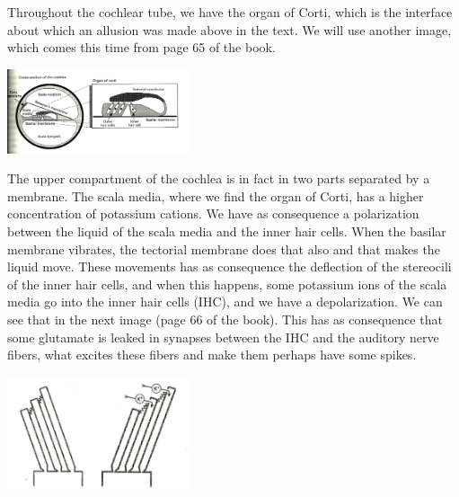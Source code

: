 Throughout the cochlear tube, we have the organ of Corti, which is the interface
about which an allusion was made above in the text. We will use another image, 
which comes this time from page 65 of the book.

\includegraphics[width=0.4\textwidth]{images/corti-aud65-level.jpg} %

The upper compartment of the cochlea is in fact in two parts separated by a membrane.
The scala media, where we find the organ of Corti, has a higher 
concentration of potassium cations. We have as consequence a polarization between
the liquid of the scala media and the inner hair cells. 
When the basilar membrane vibrates, the tectorial membrane does 
that also and that makes the liquid move. 
These movements has as consequence the deflection of the stereocili 
of the inner hair cells, and when this happens, some potassium ions of the 
scala media go into the inner hair cells (IHC), and we have a depolarization. 
We can see that in the next image (page 66 of the book).
This has as consequence that some glutamate is leaked in synapses 
between the IHC and the auditory nerve fibers, what excites these fibers 
and make them perhaps have some spikes.

\includegraphics[width=0.4\textwidth]{images/hctransd-aud66-level.jpg}